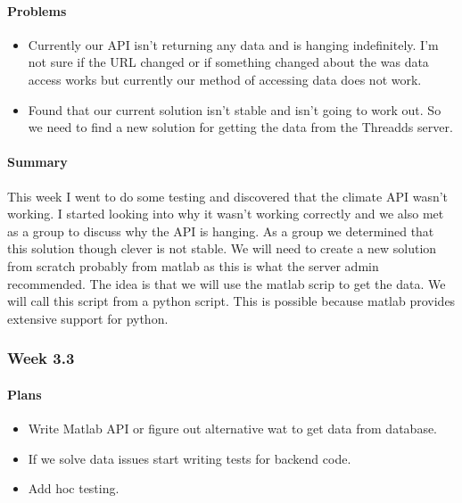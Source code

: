 \documentclass[onecolumn, draftclsnofoot,10pt, compsoc]{article}
\begin{document}
		    \paragraph{Problems} \hfill \break
		        \begin{itemize}
		            \item Currently our API isn't returning any data and is hanging indefinitely. I'm not sure if the URL changed or if something changed about the was data access works but currently our method of accessing data does not work.\\
		            \item Found that our current solution isn't stable and isn't going to work out. So we need to find a new solution for getting the data from the Threadds server.\\
		        \end{itemize}
		    \paragraph{Summary} \hfill \break
		    This week I went to do some testing and discovered that the climate API wasn't working. I started looking into why it wasn't working correctly and we also met as a group to discuss why the API is hanging. As a group we determined that this solution though clever is not stable. We will need to create a new solution from scratch probably from matlab as this is what the server admin recommended. The idea is that we will use the matlab scrip to get the data. We will call this script from a python script. This is possible because matlab provides extensive support for python.\\ 
    
		\subsubsection{Week 3.3}
		    \paragraph{Plans} \hfill \break
		        \begin{itemize}
		            \item Write Matlab API or figure out alternative wat to get data from database.\\
		            \item If we solve data issues start writing tests for backend code.\\
		            \item Add hoc testing.
		        \end{itemize}
\end{document}
